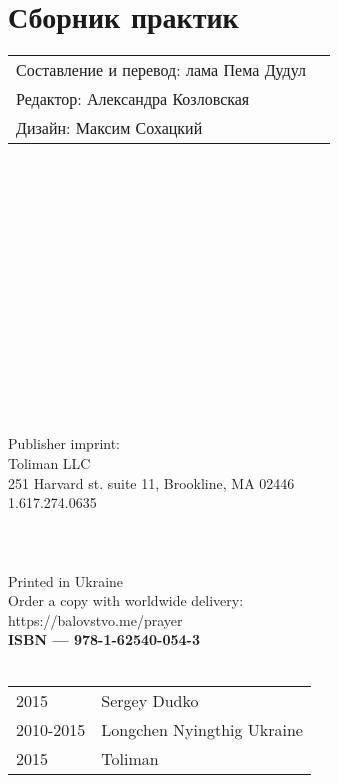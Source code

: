 \section*{Сборник практик}

\begin{tabular}{ll}
Составление и перевод: лама Пема Дудул\\
Редактор: Александра Козловская\\
Дизайн: Максим Сохацкий\\
\end{tabular}
\\
\\
\\
\\
\\
\\
\\
\\
\\
\\
\\
\\
\\
\\
Publisher imprint: \\
Toliman LLC \\
251 Harvard st. suite 11, Brookline, MA 02446 \\
1.617.274.0635 \\
\\
\\
\\
Printed in Ukraine \\

Order a copy with worldwide delivery: \\
https://balovstvo.me/prayer \\

{\bf  ISBN — 978-1-62540-054-3 \hspace{2em}} \\ \\

\begin{tabular}{ll}
\textcopyright{} 2015 & Sergey Dudko \\
\textcopyright{} 2010-2015 & Longchen Nyingthig Ukraine\\
\textcopyright{} 2015 & Toliman \\
\end{tabular}
